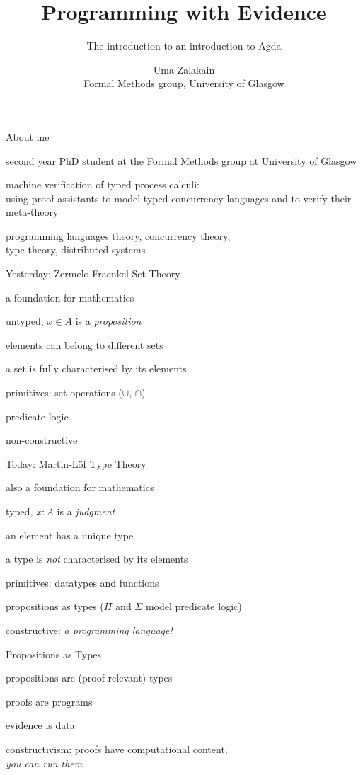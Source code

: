 \documentclass[dvipsnames]{beamer}
\title{Programming with Evidence}
\subtitle{\small The introduction to an introduction to Agda}
\author{Uma Zalakain\\\tiny Formal Methods group, University of Glasgow}
\date{}
\institute{Basque Center for Applied Mathematics\\\tiny November 23, 2021}
\newenvironment{wideitemize}{\itemize\addtolength{\itemsep}{1em}}{\enditemize}
\newcommand{\sitem}{\item[\raisebox{.45ex}{\rule{.6ex}{.6ex}}]}
\begin{document}
\maketitle

\begin{frame}{About me}
\begin{wideitemize}
  \sitem second year PhD student at the Formal Methods group at University of Glasgow
  \sitem machine verification of typed process calculi:\\
    using proof assistants to model typed concurrency languages and to verify their meta-theory
  \sitem programming languages theory, concurrency theory,\\
    type theory, distributed systems
\end{wideitemize}
\end{frame}

\begin{frame}{Yesterday: Zermelo-Fraenkel Set Theory}
\begin{wideitemize}
  \sitem a foundation for mathematics
  \sitem untyped, $x \in A$ is a \emph{proposition}
  \sitem elements can belong to different sets
  \sitem a set is fully characterised by its elements
  \sitem primitives: set operations ($\cup$, $\cap$)
  \sitem predicate logic
  \sitem non-constructive
\end{wideitemize}
\end{frame}

\begin{frame}{Today: Martin-L\"of Type Theory}
\begin{wideitemize}
  \sitem also a foundation for mathematics
  \sitem typed, $x : A$ is a \emph{judgment}
  \sitem an element has a unique type
  \sitem  a type is \emph{not} characterised by its elements
  \sitem primitives: datatypes and functions
  \sitem propositions as types ($\Pi$ and $\Sigma$ model predicate logic)
  \sitem constructive: \emph{a programming language!}
\end{wideitemize}
\end{frame}

\begin{frame}{Propositions as Types}
\begin{wideitemize}
  \sitem propositions are (proof-relevant) types
  \sitem proofs are programs
  \sitem evidence is data
  \sitem constructivism: proofs have computational content,\\
    \emph{you can run them}
\end{wideitemize}
\end{frame}
\end{document}
